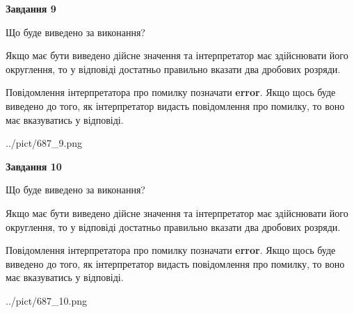 \documentclass[12pt, ukrainian]{article}
\begin{document}
{\begin {Large}
{\begin {center}\textbf{Завдання 9}\end {center}}\par
Що буде виведено за виконання? \par

Якщо має бути виведено дійсне значення та інтерпретатор має здійснювати його округлення, 
то у відповіді достатньо правильно вказати два дробових розряди.

Повідомлення інтерпретатора про помилку позначати \textbf{error}.
Якщо щось буде виведено до того, як інтерпретатор видасть повідомлення про помилку, 
то воно має вказуватись у відповіді. \par

\begin{center}
	{../pict/687_9.png}
\end{center}
\newpage

{\begin {center}\textbf{Завдання 10}\end {center}}\par
Що буде виведено за виконання? \par

Якщо має бути виведено дійсне значення та інтерпретатор має здійснювати його округлення, 
то у відповіді достатньо правильно вказати два дробових розряди.

Повідомлення інтерпретатора про помилку позначати \textbf{error}.
Якщо щось буде виведено до того, як інтерпретатор видасть повідомлення про помилку, 
то воно має вказуватись у відповіді. \par

\begin{center}
	{../pict/687_10.png}
\end{center}
\newpage

\end {Large}}
\end{document}

